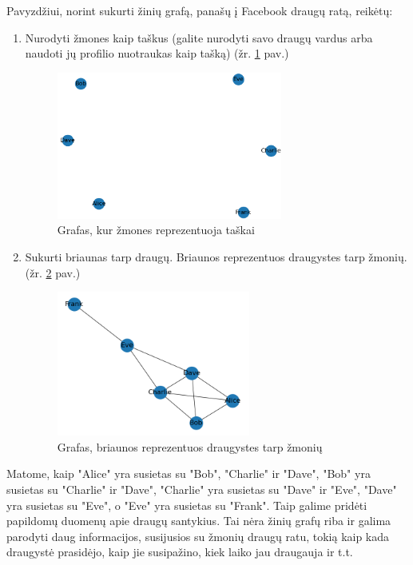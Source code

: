 \documentclass{VUMIFPSkursinis}
\begin{document}
 Pavyzdžiui, norint sukurti žinių grafą, panašų į Facebook draugų ratą, reikėtų:
\begin{enumerate}
\item Nurodyti žmones kaip taškus (galite nurodyti savo draugų vardus arba naudoti jų profilio nuotraukas kaip tašką) (žr. \ref{fig:nodes} pav.)

\begin{figure}[htbp]
  \centering
  \includegraphics[width=0.7\textwidth]{img/nodes.png}
  \caption{Grafas, kur žmones reprezentuoja taškai}
  \label{fig:nodes}
\end{figure}

\item Sukurti briaunas tarp draugų. Briaunos reprezentuos draugystes tarp žmonių. (žr. \ref{fig:vertex} pav.)
\begin{figure}[htbp]
  \centering
  \includegraphics[width=0.6\textwidth]{img/vertex.png}
  \caption{Grafas, briaunos reprezentuos draugystes tarp žmonių}
  \label{fig:vertex}
\end{figure}
\end{enumerate}

Matome, kaip "Alice" yra susietas su "Bob", "Charlie" ir "Dave", "Bob" yra susietas su "Charlie" ir "Dave", "Charlie" yra susietas su "Dave" ir "Eve", "Dave" yra susietas su "Eve", o "Eve" yra susietas su "Frank". Taip galime pridėti papildomų duomenų apie draugų santykius. Tai nėra žinių grafų riba ir galima parodyti daug informacijos, susijusios su žmonių draugų ratu, tokią kaip kada draugystė prasidėjo, kaip jie susipažino, kiek laiko jau draugauja ir t.t.
\end{document}
